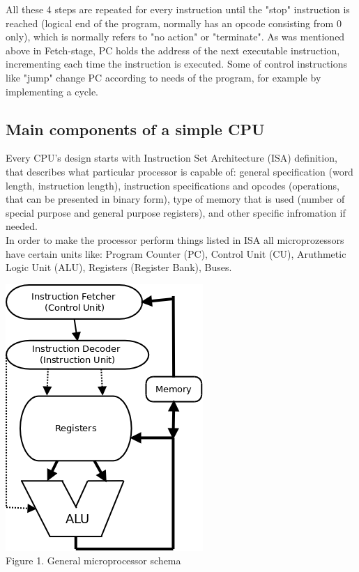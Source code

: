 \documentclass[11pt,a4paper]{article}
\begin{document}
All these 4 steps are repeated for every instruction until the "stop" instruction is reached (logical end of the program, normally has an opcode consisting from 0 only), which is normally refers to "no action" or "terminate". As was mentioned above in Fetch-stage, PC holds the address of the next executable instruction, incrementing each time the instruction is executed. Some of control instructions like "jump" change PC according to needs of the program, for example by implementing a cycle.\\
\subsection{Main components of a simple CPU}
Every CPU's design starts with Instruction Set Architecture (ISA) definition, that describes what particular processor is capable of: general specification (word length, instruction length), instruction specifications and opcodes (operations, that can be presented in binary form), type of memory that is used (number of special purpose and general purpose registers), and other specific infromation if needed. \\
In order to make the processor perform things listed in ISA all microprozessors have certain units like: Program Counter (PC), Control Unit (CU), Aruthmetic Logic Unit (ALU), Registers (Register Bank), Buses.\\
\begin{center}
\includegraphics[scale=0.4]{pics/simpleCPU3.png}\\
Figure 1. General microprocessor schema
\end{center}
\end{document}
